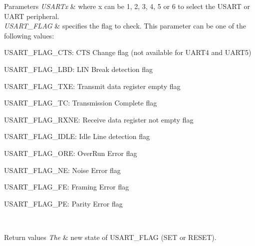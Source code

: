 \begin{DoxyParams}{Parameters}
{\em U\+S\+A\+R\+Tx} & where x can be 1, 2, 3, 4, 5 or 6 to select the U\+S\+A\+RT or U\+A\+RT peripheral. \\
\hline
{\em U\+S\+A\+R\+T\+\_\+\+F\+L\+AG} & specifies the flag to check. This parameter can be one of the following values\+: \begin{DoxyItemize}
\item U\+S\+A\+R\+T\+\_\+\+F\+L\+A\+G\+\_\+\+C\+TS\+: C\+TS Change flag (not available for U\+A\+R\+T4 and U\+A\+R\+T5) \item U\+S\+A\+R\+T\+\_\+\+F\+L\+A\+G\+\_\+\+L\+BD\+: L\+IN Break detection flag \item U\+S\+A\+R\+T\+\_\+\+F\+L\+A\+G\+\_\+\+T\+XE\+: Transmit data register empty flag \item U\+S\+A\+R\+T\+\_\+\+F\+L\+A\+G\+\_\+\+TC\+: Transmission Complete flag \item U\+S\+A\+R\+T\+\_\+\+F\+L\+A\+G\+\_\+\+R\+X\+NE\+: Receive data register not empty flag \item U\+S\+A\+R\+T\+\_\+\+F\+L\+A\+G\+\_\+\+I\+D\+LE\+: Idle Line detection flag \item U\+S\+A\+R\+T\+\_\+\+F\+L\+A\+G\+\_\+\+O\+RE\+: Over\+Run Error flag \item U\+S\+A\+R\+T\+\_\+\+F\+L\+A\+G\+\_\+\+NE\+: Noise Error flag \item U\+S\+A\+R\+T\+\_\+\+F\+L\+A\+G\+\_\+\+FE\+: Framing Error flag \item U\+S\+A\+R\+T\+\_\+\+F\+L\+A\+G\+\_\+\+PE\+: Parity Error flag \end{DoxyItemize}
\\
\hline
\end{DoxyParams}

\begin{DoxyRetVals}{Return values}
{\em The} & new state of U\+S\+A\+R\+T\+\_\+\+F\+L\+AG (S\+ET or R\+E\+S\+ET). \\
\hline
\end{DoxyRetVals}
